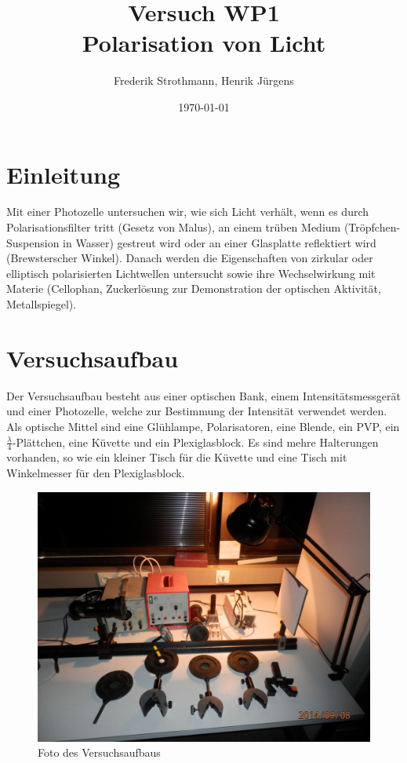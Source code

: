 \documentclass[12pt]{scrartcl}
\title{Versuch WP1\\ Polarisation von Licht}
\author{Frederik Strothmann, Henrik Jürgens}
\date{\today}
\begin{document}

\maketitle
\tableofcontents
\newpage


\section{Einleitung}
Mit einer Photozelle untersuchen wir, wie sich Licht verhält, wenn es durch Polarisationsfilter tritt (Gesetz von Malus), an einem trüben Medium (Tröpfchen-Suspension in Wasser) gestreut wird oder an einer Glasplatte reflektiert wird (Brewsterscher Winkel).
Danach werden die Eigenschaften von zirkular oder elliptisch polarisierten Lichtwellen untersucht sowie ihre Wechselwirkung mit Materie (Cellophan, Zuckerlösung zur Demonstration der optischen Aktivität, Metallspiegel). 


\section{Versuchsaufbau}
Der Versuchsaufbau besteht aus einer optischen Bank, einem Intensitätsmessgerät und einer Photozelle, welche zur Bestimmung der Intensität verwendet werden. Als optische Mittel sind eine Glühlampe, Polarisatoren, eine Blende, ein PVP, ein $\frac{\lambda}{4}$-Plättchen, eine Küvette und ein Plexiglasblock. Es sind mehre Halterungen vorhanden, so wie ein kleiner Tisch für die Küvette und eine Tisch mit Winkelmesser für den Plexiglasblock.

\begin{figure}[H]
\centering
    \includegraphics[scale = 0.1]{aufbau.JPG}
  	\caption[Foto des Versuchsaufbaus]{Foto des Versuchsaufbaus}
  \label{fig:a_1}
\end{figure}
\end{document}
